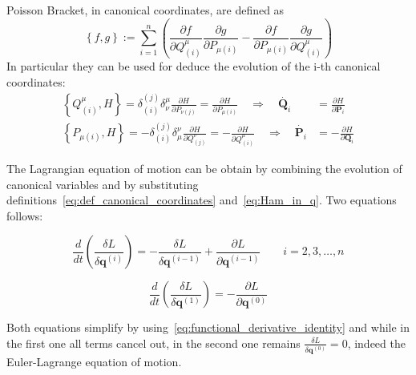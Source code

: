 \begin{enumerate}
    Poisson Bracket, in canonical coordinates, are defined as
    \begin{equation*} \label{eq:possion_braket}
      \left\{ f, g \right\} := \sum_{i=1}^{n} \left(
        \frac{\partial f}{\partial Q^{\mu}_{(i)}}
        \frac{\partial g}{\partial P_{\mu(i)}} -
        \frac{\partial f}{\partial P_{\mu(i)}}
        \frac{\partial g}{\partial Q^{\mu}_{(i)}}
      \right)
    \end{equation*}
    In particular they can be used for deduce the evolution of the i-th
    canonical coordinates:
    \begin{align*}
      \left\{ Q^{\mu}_{(i)}, H\right\}
      = \delta^{(j)}_{(i)} \delta^{\mu}_{\nu}
          \frac{\partial H}{\partial P_{\nu(j)}}
      = \frac{\partial H}{\partial P_{\mu(i)}}
      \quad \Rightarrow \quad
      \dot{\bm{Q}_i} &=  \frac{\partial H}{\partial \bm{P}_i}
      \\
      \left\{ P_{\mu(i)}, H\right\}
      = - \delta^{(j)}_{(i)} \delta^{\nu}_{\mu}
          \frac{\partial H}{\partial Q^{\nu}_{(j)}}
      = - \frac{\partial H}{\partial Q^{\mu}_{(i)}}
      \quad \Rightarrow \quad
      \dot{\bm{P}_i} &= -\frac{\partial H}{\partial \bm{Q}_i}
    \end{align*}
\end{enumerate}

The Lagrangian equation of motion can be obtain by combining the evolution of
canonical variables and by substituting
definitions~\eqref{eq:def_canonical_coordinates} and~\eqref{eq:Ham_in_q}. Two
equations follows:

\begin{equation} \label{eq:ham_to_lagr_1}
  \frac{d}{dt}\left(\frac{\delta L}{\delta \bm{q}^{(i)}}\right) = -
  \frac{\delta L}{\delta \bm{q}^{(i-1)}} +
  \frac{\partial L}{\partial \bm{q}^{(i-1)}}
  \qquad i = 2, 3, \ldots, n
\end{equation}

\begin{equation} \label{eq:ham_to_lagr_2}
  \frac{d}{dt}\left(\frac{\delta L}{\delta \bm{q}^{(1)}}\right) = -
  \frac{\partial L}{\partial \bm{q}^{(0)}}
\end{equation}

Both equations simplify by using~\eqref{eq:functional_derivative_identity} and
while in the first one all terms cancel out, in the second one remains
$\frac{\delta L}{\delta \bm{q}^{(0)}} = 0$, indeed the Euler-Lagrange equation
of motion. \\

